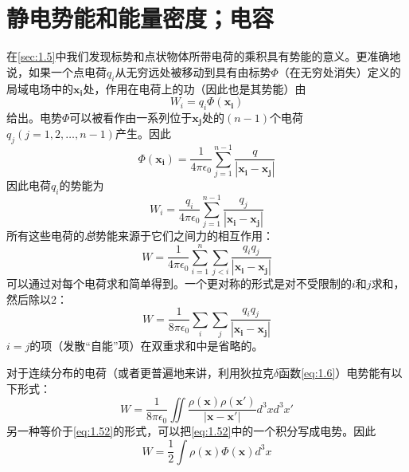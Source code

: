 \documentclass[12pt]{book}
\numberwithin{equation}{chapter}
\numberwithin{figure}{chapter}
\numberwithin{footnote}{page}
\begin{document}
\section{静电势能和能量密度；电容}\label{sec:1.11}

在\autoref{sec:1.5}中我们发现标势和点状物体所带电荷的乘积具有势能的意义。更准确地说，如果一个点电荷$q_i$从无穷远处被移动到具有由标势$\Phi$（在无穷处消失）定义的局域电场中的$\mathbf{x_i}$处，作用在电荷上的功（因此也是其势能）由
\begin{equation}\label{eq:1.47}
    W_i=q_i\Phi(\mathbf{x_i})
\end{equation}
给出。电势$\Phi$可以被看作由一系列位于$\mathbf{x_j}$处的$(n-1)$个电荷$q_j(j=1,2,\dots,n-1)$产生。因此
\begin{equation}\label{eq:1.48}
    \Phi(\mathbf{x_i})=\frac{1}{4\pi\epsilon_0}\sum_{j=1}^{n-1}\frac{q}{|\mathbf{x_i}-\mathbf{x_j}|}
\end{equation}
因此电荷$q_i$的势能为
\begin{equation}\label{eq:1.49}
    W_i=\frac{q_i}{4\pi\epsilon_0}\sum_{j=1}^{n-1}\frac{q_j}{|\mathbf{x_i}-\mathbf{x_j}|}
\end{equation}
所有这些电荷的\textit{总}势能来源于它们之间力的相互作用：
\begin{equation}\label{eq:1.50}
    W=\frac{1}{4\pi\epsilon_0}\sum_{i=1}^n\sum_{j<i}\frac{q_iq_j}{|\mathbf{x_i}-\mathbf{x_j}|}
\end{equation}
可以通过对每个电荷求和简单得到。一个更对称的形式是对不受限制的$i$和$j$求和，然后除以2：
\begin{equation}\label{eq:1.51}
    W=\frac{1}{8\pi\epsilon_0}\sum_{i}\sum_{j}\frac{q_iq_j}{|\mathbf{x_i}-\mathbf{x_j}|}
\end{equation}
$i=j$的项（发散“自能”项）在双重求和中是省略的。

对于连续分布的电荷（或者更普遍地来讲，利用狄拉克$\delta$函数\autoref{eq:1.6}）电势能有以下形式：
\begin{equation}\label{eq:1.52}
    W=\frac{1}{8\pi\epsilon_0}\iint\frac{\rho(\mathbf{x})\rho(\mathbf{x'})}{|\mathbf{x}-\mathbf{x'}|}d^3x d^3x'
\end{equation}
另一种等价于\autoref{eq:1.52}的形式，可以把\autoref{eq:1.52}中的一个积分写成电势。因此
\begin{equation}\label{eq:1.53}
    W=\frac{1}{2}\int \rho(\mathbf{x})\Phi(\mathbf{x})d^3x
\end{equation}
\end{document}
